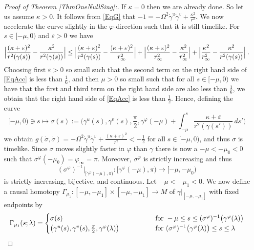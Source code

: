 \documentclass[reqno]{article}
\begin{document}
\begin{proof}[Proof of Theorem \ref{ThmOneNullSing}:]
If $\kappa = 0$ then we are already done. So let us assume $\kappa >0$. It follows from \eqref{EqG} that $-1 = -\Omega^2 \dot{\gamma}^u \dot{\gamma}^v + \frac{\kappa^2}{r^2}$. 
We now accelerate  the curve slightly in the $\varphi$-direction  such that it is still timelike. For $s \in [-\mu, 0)$ and $\varepsilon>0$ we have
\begin{equation}
\label{EqAcc}
\Big{|} \frac{(\kappa + \varepsilon)^2}{r^2(\gamma(s))} - \frac{\kappa^2}{r^2(\gamma(s))} \Big{|} \leq \Big{|} \frac{(\kappa + \varepsilon)^2}{r^2(\gamma(s))} - \frac{(\kappa + \varepsilon)^2}{r^2_\infty} \Big{|} + \Big{|} \frac{(\kappa + \varepsilon)^2}{r^2_\infty} - \frac{\kappa^2}{r_\infty^2}\Big{|} + \Big{|} \frac{\kappa^2}{r_\infty^2} - \frac{\kappa^2}{r^2(\gamma(s))} \Big{|} \;.
\end{equation}
Choosing first $\varepsilon>0$ so small such that the second term on the right hand side of \eqref{EqAcc} is  less than $\frac{1}{6}$, and then $\mu>0$ so small such that for all $s \in [-\mu, 0)$ we have that the first and third term on the right hand side are also less than $\frac{1}{6}$, we obtain that the right hand side of \eqref{EqAcc} is less than $\frac{1}{2}$. Hence, defining the curve $$ [-\mu, 0) \ni s \mapsto \sigma(s) := \big(\gamma^u(s), \gamma^v(s), \frac{\pi}{2}, \gamma^\varphi(-\mu) + \int_{-\mu}^s \frac{\kappa +\varepsilon}{r^2(\gamma(s'))} \, ds' \big) $$
we obtain $g(\dot{\sigma}, \dot{\sigma}) = -\Omega^2 \dot{\gamma}^u \dot{\gamma}^v + \frac{(\kappa + \varepsilon)^2}{r^2} < -\frac{1}{2}$ for all $s \in [-\mu, 0)$, and thus $\sigma$ is timelike. Since $\sigma$ moves slightly faster in $\varphi$ than $\gamma$ there is now a $-\mu < -\mu_0 < 0$ such that $\sigma^\varphi(-\mu_0) = \varphi_\infty = \pi$. Moreover, $\sigma^\varphi$ is strictly increasing and thus $$(\sigma^\varphi)^{-1} \Big|_{[\gamma^\varphi(-\mu), \pi)} : [\gamma^\varphi(-\mu), \pi) \to [-\mu, -\mu_0)$$ is  strictly increasing, bijective, and continuous.  Let $-\mu < -\mu_1 <0$. We now define a causal homotopy $\Gamma_{\mu_1} : [-\mu, -\mu_1] \times [-\mu, -\mu_1] \to M$ of $\gamma|_{[-\mu, -\mu_1]}$ with fixed endpoints by
$$\Gamma_{\mu_1} (s ; \lambda) = \begin{cases} \sigma(s) \qquad \qquad &\textnormal{ for } -\mu \leq s \leq (\sigma^\varphi)^{-1} \big(\gamma^\varphi(\lambda)\big) \\
\big(\gamma^u(s), \gamma^v(s), \frac{\pi}{2}, \gamma^\varphi(\lambda)\big) \qquad \qquad &\textnormal{ for } (\sigma^\varphi)^{-1} \big(\gamma^\varphi(\lambda) \big)\leq s \leq \lambda \\

\end{cases}$$
\end{proof}
\end{document}
